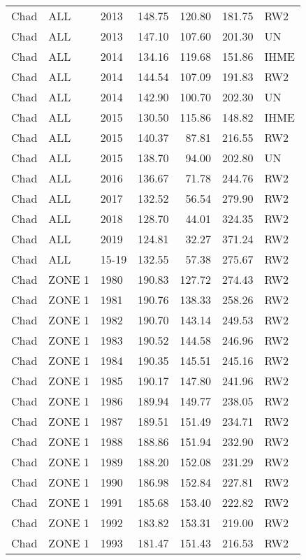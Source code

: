 \begin{longtable}{lllrrrl}
  Chad & ALL & 2013 & 148.75 & 120.80 & 181.75 & RW2 \\ 
  Chad & ALL & 2013 & 147.10 & 107.60 & 201.30 & UN \\ 
  Chad & ALL & 2014 & 134.16 & 119.68 & 151.86 & IHME \\ 
  Chad & ALL & 2014 & 144.54 & 107.09 & 191.83 & RW2 \\ 
  Chad & ALL & 2014 & 142.90 & 100.70 & 202.30 & UN \\ 
  Chad & ALL & 2015 & 130.50 & 115.86 & 148.82 & IHME \\ 
  Chad & ALL & 2015 & 140.37 & 87.81 & 216.55 & RW2 \\ 
  Chad & ALL & 2015 & 138.70 & 94.00 & 202.80 & UN \\ 
  Chad & ALL & 2016 & 136.67 & 71.78 & 244.76 & RW2 \\ 
  Chad & ALL & 2017 & 132.52 & 56.54 & 279.90 & RW2 \\ 
  Chad & ALL & 2018 & 128.70 & 44.01 & 324.35 & RW2 \\ 
  Chad & ALL & 2019 & 124.81 & 32.27 & 371.24 & RW2 \\ 
  Chad & ALL & 15-19 & 132.55 & 57.38 & 275.67 & RW2 \\ 
  Chad & ZONE 1 & 1980 & 190.83 & 127.72 & 274.43 & RW2 \\ 
  Chad & ZONE 1 & 1981 & 190.76 & 138.33 & 258.26 & RW2 \\ 
  Chad & ZONE 1 & 1982 & 190.70 & 143.14 & 249.53 & RW2 \\ 
  Chad & ZONE 1 & 1983 & 190.52 & 144.58 & 246.96 & RW2 \\ 
  Chad & ZONE 1 & 1984 & 190.35 & 145.51 & 245.16 & RW2 \\ 
  Chad & ZONE 1 & 1985 & 190.17 & 147.80 & 241.96 & RW2 \\ 
  Chad & ZONE 1 & 1986 & 189.94 & 149.77 & 238.05 & RW2 \\ 
  Chad & ZONE 1 & 1987 & 189.51 & 151.49 & 234.71 & RW2 \\ 
  Chad & ZONE 1 & 1988 & 188.86 & 151.94 & 232.90 & RW2 \\ 
  Chad & ZONE 1 & 1989 & 188.20 & 152.08 & 231.29 & RW2 \\ 
  Chad & ZONE 1 & 1990 & 186.98 & 152.84 & 227.81 & RW2 \\ 
  Chad & ZONE 1 & 1991 & 185.68 & 153.40 & 222.82 & RW2 \\ 
  Chad & ZONE 1 & 1992 & 183.82 & 153.31 & 219.00 & RW2 \\ 
  Chad & ZONE 1 & 1993 & 181.47 & 151.43 & 216.53 & RW2 \\ 

\end{longtable}
